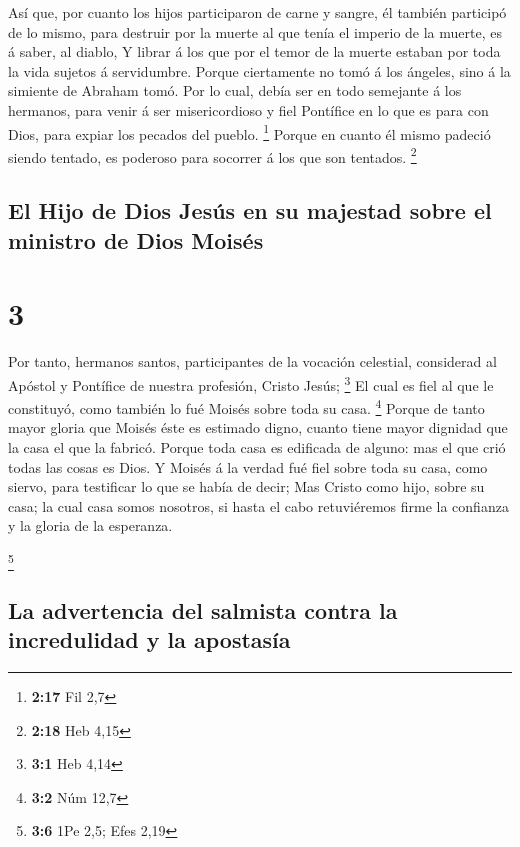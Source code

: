  Así que, por cuanto los hijos participaron de carne y
sangre, él también participó de lo mismo, para destruir por la muerte al
que tenía el imperio de la muerte, es á saber, al diablo, 
Y librar á los que por el temor de la muerte estaban por toda la vida
sujetos á servidumbre.  Porque ciertamente no tomó á los
ángeles, sino á la simiente de Abraham tomó.  Por lo cual,
debía ser en todo semejante á los hermanos, para venir á ser
misericordioso y fiel Pontífice en lo que es para con Dios, para expiar
los pecados del pueblo. \footnote{\textbf{2:17} Fil 2,7} 
Porque en cuanto él mismo padeció siendo tentado, es poderoso para
socorrer á los que son tentados. \footnote{\textbf{2:18} Heb 4,15}

\hypertarget{el-hijo-de-dios-jesuxfas-en-su-majestad-sobre-el-ministro-de-dios-moisuxe9s}{%
\subsection{El Hijo de Dios Jesús en su majestad sobre el ministro de
Dios
Moisés}\label{el-hijo-de-dios-jesuxfas-en-su-majestad-sobre-el-ministro-de-dios-moisuxe9s}}

\hypertarget{section-2}{%
\section{3}\label{section-2}}

 Por tanto, hermanos santos, participantes de la vocación
celestial, considerad al Apóstol y Pontífice de nuestra profesión,
Cristo Jesús; \footnote{\textbf{3:1} Heb 4,14}  El cual es
fiel al que le constituyó, como también lo fué Moisés sobre toda su
casa. \footnote{\textbf{3:2} Núm 12,7}  Porque de tanto
mayor gloria que Moisés éste es estimado digno, cuanto tiene mayor
dignidad que la casa el que la fabricó.  Porque toda casa es
edificada de alguno: mas el que crió todas las cosas es Dios.
 Y Moisés á la verdad fué fiel sobre toda su casa, como
siervo, para testificar lo que se había de decir;  Mas
Cristo como hijo, sobre su casa; la cual casa somos nosotros, si hasta
el cabo retuviéremos firme la confianza y la gloria de la esperanza.

\footnote{\textbf{3:6} 1Pe 2,5; Efes 2,19}

\hypertarget{la-advertencia-del-salmista-contra-la-incredulidad-y-la-apostasuxeda}{%
\subsection{La advertencia del salmista contra la incredulidad y la
apostasía}\label{la-advertencia-del-salmista-contra-la-incredulidad-y-la-apostasuxeda}}

